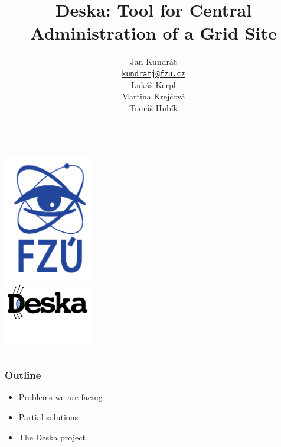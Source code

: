 \documentclass{beamer}
\begin{document}
\title{Deska: Tool for Central Administration of a Grid Site}
\author{Jan Kundrát \\ \href{mailto:kundratj@fzu.cz}{\nolinkurl{kundratj@fzu.cz}}
\vspace{5mm}
\\ Lukáš Kerpl \\ Martina Krejčová \\ Tomáš Hubík}
\begin{frame}
\begin{columns}
\begin{column}{.4\textwidth}
\includegraphics[width=4cm]{logo-FZU-male.pdf} \\
\includegraphics[width=4cm]{deska_logo.pdf}
\end{column}
\begin{column}{.6\textwidth}
\maketitle
\end{column}
\end{columns}
\end{frame}

\begin{frame}[fragile]
\frametitle{Outline}
\begin{itemize}
    \item Problems we are facing
    \item Partial solutions
    \item The Deska project
\end{itemize}
\end{frame}
\end{document}
